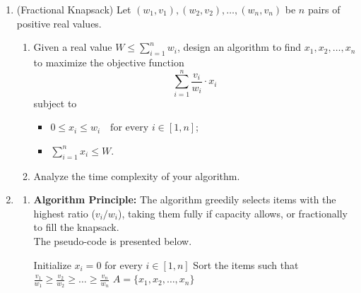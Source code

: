 \documentclass[12pt,a4paper]{article}
\makeatletter
\newtheorem*{solution}{Solution}
\theoremstyle{definition}
\renewenvironment{solution}[1][Solution]
{\par\pushQED{\qed}\normalfont\topsep6\p@\@plus6\p@\relax\trivlist
\item[\hskip\labelsep\bfseries#1\@addpunct{.}]\ignorespaces}{\popQED\endtrivlist\@endpefalse}
\makeatother
\begin{document}
\begin{enumerate}
  \item {\color{purple}(Fractional Knapsack)} Let \((w_{1},v_{1}), (w_{2},v_{2}), \ldots, (w_{n},v_{n})\) be \(n\) pairs of positive real values. 
\begin{enumerate}
    \item Given a real value \(W \leq \sum_{i=1}^{n} w_{i}\), design an algorithm to find \(x_{1}, x_{2}, \ldots, x_{n}\) to maximize the objective function
\[
\sum_{i=1}^{n} \frac{v_{i}}{w_{i}} \cdot x_{i}
\]
subject to
\begin{itemize}
    \item $0 \leq x_{i} \leq w_{i} \quad \text{for every } i \in [1,n]$;
    \item $\sum_{i=1}^{n} x_{i} \leq W$.
\end{itemize}
    \item Analyze the time complexity of your algorithm.
\end{enumerate}

\begin{solution}
    \begin{enumerate}
        \item 
             \textbf{Algorithm Principle:} The algorithm greedily selects items with the highest ratio ($v_i/w_i$), taking them fully if capacity allows, or fractionally to fill the knapsack. \\
             The pseudo-code is presented below.

        \begin{minipage}{\linewidth}
            \begin{algorithm}[H]
            \setcounter{AlgoLine}{0}
            \BlankLine
            Initialize $x_i = 0$ for every $i \in [1,n]$\;
            Sort the items such that \(\frac{v_1}{w_1} \geq \frac{v_2}{w_2} \geq \ldots \geq \frac{v_n}{w_n}\)\;
            \Return $A = \{x_{1}, x_{2}, \ldots, x_{n}\}$\;
            \caption{Fractional Knapsack Greedy Algorithm}
           \end{algorithm}


\end{minipage}
\end{enumerate}
\end{solution}
\end{enumerate}
\end{document}
